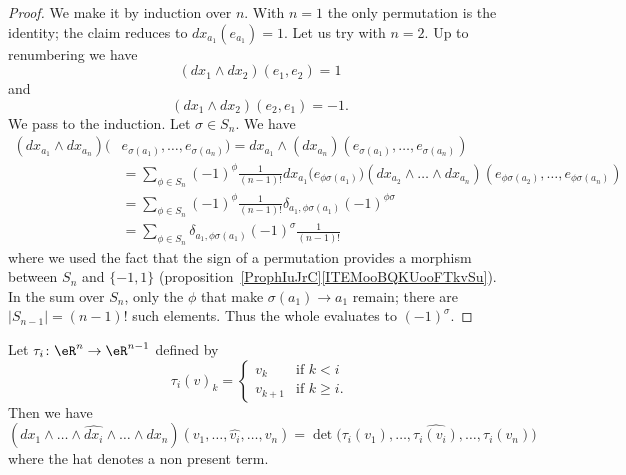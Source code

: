 \begin{proof}
    We make it by induction over \( n\). With \( n=1\) the only permutation is the identity; the claim reduces to \( dx_{a_1}(e_{a_1})=1\). Let us try with \( n=2\). Up to renumbering we have
    \begin{equation}
        (dx_1\wedge dx_2)(e_1,e_2)=1
    \end{equation}
    and
    \begin{equation}
        (dx_1\wedge dx_2)(e_2,e_1)=-1.
    \end{equation}
    We pass to the induction. Let \( \sigma\in S_n\). We have
    \begin{subequations}
        \begin{align}
            (dx_{a_1}\wedge dx_{a_n})(&e_{\sigma(a_1)},\ldots, e_{\sigma(a_n)})=dx_{a_1}\wedge (dx_{a_n})(e_{\sigma(a_1)},\ldots, e_{\sigma(a_n)})\\
            &=\sum_{\phi\in S_n}(-1)^{\phi}\frac{1}{ (n-1)! }dx_{a_1}\big( e_{\phi\sigma(a_1)} \big)(dx_{a_2}\wedge\ldots\wedge dx_{a_n})(e_{\phi\sigma(a_2)},\ldots, e_{\phi\sigma(a_n)})\\
            &=\sum_{\phi\in S_n}(-1)^{\phi}\frac{1}{ (n-1)! }\delta_{a_1,\phi\sigma(a_1)}(-1)^{\phi\sigma}\\
            &=\sum_{\phi\in S_n}\delta_{a_1,\phi\sigma(a_1)}(-1)^{\sigma}\frac{1}{ (n-1)! }
        \end{align}
    \end{subequations}
    where we used the fact that the sign of a permutation provides a morphism between \( S_n\) and \( \{ -1,1 \}\) (proposition~\ref{ProphIuJrC}\ref{ITEMooBQKUooFTkvSu}). In the sum over \( S_n\), only the \( \phi\) that make \( \sigma(a_1)\to a_1\) remain; there are \( | S_{n-1} |=(n-1)!\) such elements. Thus the whole evaluates to \( (-1)^{\sigma}\).
\end{proof}

\begin{lemma}    \label{LEMooICRXooFKPCRd}
    Let \( \tau_i\colon \eR^n\to \eR^{n-1}\) defined by
    \begin{equation}
        \tau_i(v)_k=\begin{cases}
            v_k    &   \text{if } k<i\\
            v_{k+1}    &    \text{if } k\geq i\text{.}
        \end{cases}
    \end{equation}
    Then we have
    \begin{equation}
        (dx_1\wedge\ldots\wedge\widehat{dx_i}\wedge\ldots\wedge dx_n)(v_1,\ldots, \widehat{v_i},\ldots, v_n)=
        \det\Big(  \tau_i(v_1),\ldots, \widehat{\tau_i(v_i)},\ldots, \tau_i(v_n)  \Big)
    \end{equation}
    where the hat denotes a non present term.
\end{lemma}

